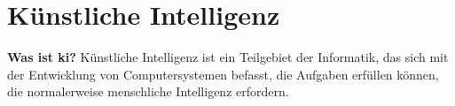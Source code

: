 \section{Künstliche Intelligenz}
\label{sec:ai}
\textbf{Was ist ki?} \newline
Künstliche Intelligenz ist ein Teilgebiet der Informatik, das sich mit der Entwicklung von Computersystemen befasst, die Aufgaben erfüllen können, die normalerweise menschliche Intelligenz erfordern.
